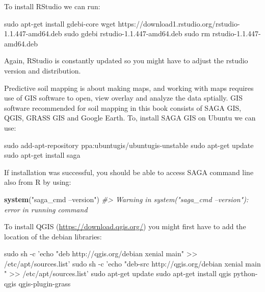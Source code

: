 \documentclass[11pt]{krantz}
\newenvironment{Shaded}{\begin{snugshade}}{\end{snugshade}}
\newcommand{\CommentTok}[1]{\textcolor[rgb]{0.37,0.37,0.37}{\textit{#1}}}
\newcommand{\FunctionTok}[1]{\textcolor[rgb]{0,0,0}{#1}}
\newcommand{\KeywordTok}[1]{\textcolor[rgb]{0.27,0.27,0.27}{\textbf{#1}}}
\newcommand{\NormalTok}[1]{#1}
\newcommand{\StringTok}[1]{\textcolor[rgb]{0.5,0.5,0.5}{#1}}
\theoremstyle{definition}
\theoremstyle{definition}
\theoremstyle{definition}
\theoremstyle{remark}
\begin{document}
To install RStudio we can run:

\begin{Shaded}
\begin{Highlighting}[]
\FunctionTok{sudo}\NormalTok{ apt-get install gdebi-core}
\FunctionTok{wget}\NormalTok{ https://download1.rstudio.org/rstudio-1.1.447-amd64.deb }
\FunctionTok{sudo}\NormalTok{ gdebi rstudio-1.1.447-amd64.deb}
\FunctionTok{sudo}\NormalTok{ rm rstudio-1.1.447-amd64.deb}
\end{Highlighting}
\end{Shaded}

Again, RStudio is constantly updated so you might have to adjust the
rstudio version and distribution.

Predictive soil mapping is about making maps, and working with maps
requires use of GIS software to open, view overlay and analyze the data
sptially. GIS software recommended for soil mapping in this book
consists of SAGA GIS, QGIS, GRASS GIS and Google Earth. To, install SAGA
GIS on Ubuntu we can use:

\begin{Shaded}
\begin{Highlighting}[]
\FunctionTok{sudo}\NormalTok{ add-apt-repository ppa:ubuntugis/ubuntugis-unstable}
\FunctionTok{sudo}\NormalTok{ apt-get update}
\FunctionTok{sudo}\NormalTok{ apt-get install saga}
\end{Highlighting}
\end{Shaded}

If installation was successful, you should be able to access SAGA
command line also from R by using:

\begin{Shaded}
\begin{Highlighting}[]
\KeywordTok{system}\NormalTok{(}\StringTok{"saga_cmd --version"}\NormalTok{)}
\CommentTok{#> Warning in system("saga_cmd --version"): error in running command}
\end{Highlighting}
\end{Shaded}

To install QGIS (\url{https://download.qgis.org/}) you might first have
to add the location of the debian libraries:

\begin{Shaded}
\begin{Highlighting}[]
\FunctionTok{sudo}\NormalTok{ sh -c }\StringTok{'echo "deb http://qgis.org/debian xenial main" >> /etc/apt/sources.list'}  
\FunctionTok{sudo}\NormalTok{ sh -c }\StringTok{'echo "deb-src http://qgis.org/debian xenial main " >> /etc/apt/sources.list'}  
\FunctionTok{sudo}\NormalTok{ apt-get update }
\FunctionTok{sudo}\NormalTok{ apt-get install qgis python-qgis qgis-plugin-grass}
\end{Highlighting}
\end{Shaded}
\end{document}
